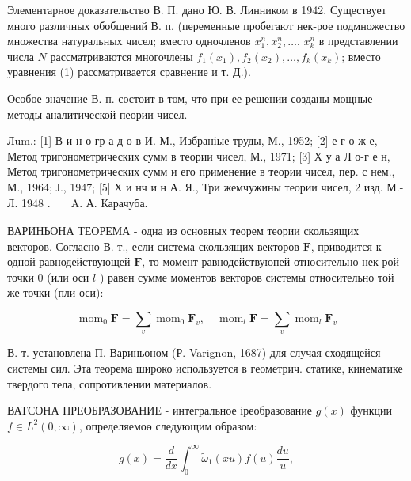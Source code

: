 \documentclass[10pt]{article}
\begin{document}
Элементарное доказательство В. П. дано Ю. В. Линником в 1942. Существует много различных обобщений В. п. (переменные пробегают нек-рое подмножество множества натуральных чисел; вместо одночленов $x_{1}^{n}, x_{2}^{n}, \ldots$, $x_{k}^{n}$ в представлении числа $N$ рассматриваются многочлены $f_{1}\left(x_{1}\right), f_{2}\left(x_{2}\right), \ldots, f_{k}\left(x_{k}\right)$; вместо уравнения (1) рассматривается сравнение и т. Д.).



Особое значение В. п. состоит в том, что при ее решении созданы мощные методы аналитической пеории чисел.



Лum.: [1] В и н о гр а д о в И. М., Избраніые труды, М., 1952; [2] е г о ж е, Метод тригонометрических сумм в теории чисел, М., 1971; [3] Х у а Л о-г е н, Метод тригонометрических сумм и его применение в теории чисел, пер. с нем., М., 1964; Ј., 1947; [5] Х и нч и н А. Я., Три жемчужины теории чисел, 2 изд. М.- Л. 1948 . $\begin{aligned} & \text { A. А. Карачуба. }\end{aligned}$



ВАРИНЬОНА ТЕОРЕМА - одна из основных теорем теории скользящих векторов. Согласно В. т., если система скользящих векторов $\boldsymbol{F}$, приводится к одной равнодействующей $\boldsymbol{F}$, то момент равнодействуюпей относительно нек-рой точки 0 (или оси $l$ ) равен сумме моментов векторов системы относительно той же точки (пли оси):



\[

\operatorname{mom}_{0} \boldsymbol{F}=\sum_{v} \operatorname{mom}_{0} \boldsymbol{F}_{v}, \quad \operatorname{mom}_{l} \boldsymbol{F}=\sum_{v} \operatorname{mom}_{l} \boldsymbol{F}_{v}

\]



В. т. установлена П. Вариньоном (Р. Varignon, 1687) для случая сходящейся системы сил. Эта теорема широко используется в геометрич. статике, кинематике твердого тела, сопротивлении материалов.



ВАТСОНА ПРЕОБРАЗОВАНИЕ - интегральное іреобразование $g(x)$ функции $f \in L^{2}(0, \infty)$, определяемоө следующим образом:



\[

g(x)=\frac{d}{d x} \int_{0}^{\infty} \tilde{\omega}_{1}(x u) f(u) \frac{d u}{u},

\]
\end{document}
